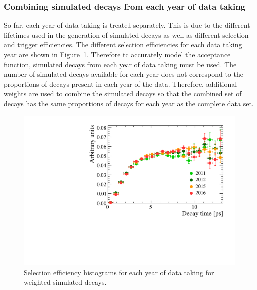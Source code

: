 \subsubsection*{Combining \boldmath{\bsmumu} simulated decays from each year of data taking}


So far, each year of data taking is treated separately. This is due to the different \bs lifetimes used in the generation of simulated decays as well as different selection and trigger efficiencies. The different selection efficiencies for each data taking year are shown in Figure~\ref{fig:accptplotyrs}. Therefore to accurately model the \bsmumu acceptance function, simulated decays from each year of data taking must be used. The number of simulated decays available for each year does not correspond to the proportions of decays present in each year of the data. Therefore, additional weights are used to combine the simulated decays so that the combined set of decays has the same proportions of decays for each year as the complete data set. 


\begin{figure}[tbp]
    \centering
        \includegraphics[width= 0.6 \textwidth]{./Figs/LifetimeMeasurement/Acceptance_per_year.pdf}
    \caption{Selection efficiency histograms for each year of data taking for weighted simulated \bsmumu decays. }
    \label{fig:accptplotyrs}
\end{figure}


